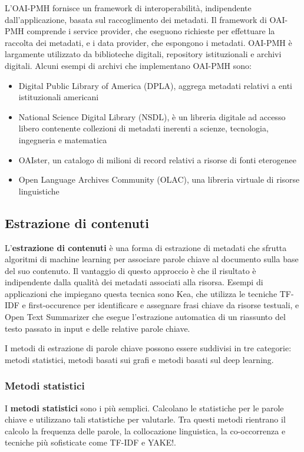 L'OAI-PMH fornisce un framework di interoperabilità, indipendente dall'applicazione, basata sul raccoglimento dei metadati. Il framework di OAI-PMH comprende i service provider, che eseguono richieste per effettuare la raccolta dei metadati, e i data provider, che espongono i metadati. OAI-PMH è largamente utilizzato da biblioteche digitali, repository istituzionali e archivi digitali\cite{harvesting}. Alcuni esempi di archivi che implementano OAI-PMH sono:

\begin{itemize}
\item Digital Public Library of America (DPLA), aggrega metadati relativi a enti istituzionali americani
\item National Science Digital Library (NSDL), è un libreria digitale ad accesso libero contenente collezioni di metadati inerenti a scienze, tecnologia, ingegneria e matematica
\item OAIster, un catalogo di milioni di record relativi a risorse di fonti eterogenee
\item Open Language Archives Community (OLAC), una libreria virtuale di risorse linguistiche
\end{itemize}

\subsection{Estrazione di contenuti}
L'\textbf{estrazione di contenuti} è una forma di estrazione di metadati che sfrutta algoritmi di machine learning per associare parole chiave al documento sulla base del suo contenuto. Il vantaggio di questo approccio è che il risultato è indipendente dalla qualità dei metadati associati alla risorsa. Esempi di applicazioni che impiegano questa tecnica sono Kea, che utilizza le tecniche TF-IDF e first-occurence per identificare e assegnare frasi chiave da risorse testuali, e Open Text Summarizer che esegue l'estrazione automatica di un riassunto del testo passato in input e delle relative parole chiave. 

I metodi di estrazione di parole chiave possono essere suddivisi in tre categorie: metodi statistici, metodi basati sui grafi e metodi basati sul deep learning\cite{extraction}.

\subsubsection{Metodi statistici}
I \textbf{metodi statistici} sono i più semplici. Calcolano le statistiche per le parole chiave e utilizzano tali statistiche per valutarle. Tra questi metodi rientrano il calcolo la frequenza delle parole, la collocazione linguistica, la co-occorrenza e tecniche più sofisticate come TF-IDF e YAKE!.

